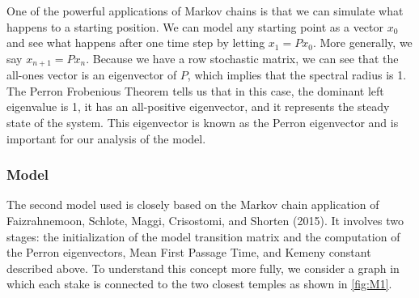 \documentclass[twoside,twocolumn]{article}
\begin{document}
One of the powerful applications of Markov chains is that we can simulate what happens to a starting position.
We can model any starting point as a vector $x_0$ and see what happens after one time step by letting $x_1 = P x_0$.
More generally, we say $x_{n + 1} = P x_n$.
Because we have a row stochastic matrix, we can see that the all-ones vector is an eigenvector of $P$, which implies that the spectral radius is 1. %
The Perron Frobenious Theorem tells us that in this case, the dominant left eigenvalue is 1, it has an all-positive eigenvector, and it represents the steady state of the system.
This eigenvector is known as the Perron eigenvector and is important for our analysis of the model.

\subsubsection{Model}
The second model used is closely based on the Markov chain application of Faizrahnemoon, Schlote, Maggi, Crisostomi, and Shorten (2015).
It involves two stages: the initialization of the model transition matrix and the computation of the Perron eigenvectors, Mean First Passage Time, and Kemeny constant described above.
To understand this concept more fully, we consider a graph in which each stake is connected to the two closest temples as shown in \ref{fig:M1}.\newline


\end{document}
